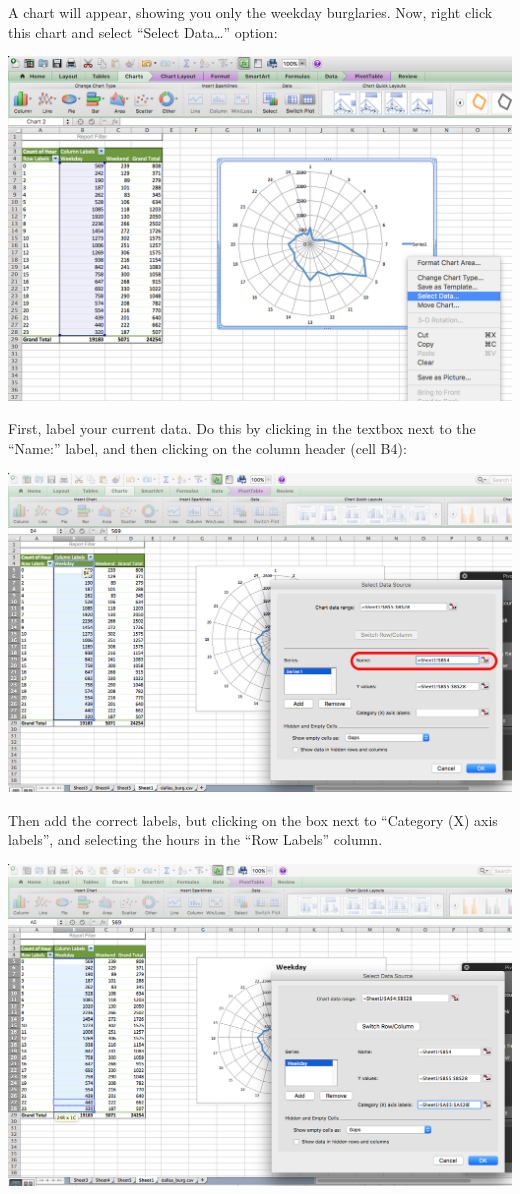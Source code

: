 \documentclass[]{book}
\theoremstyle{definition}
\theoremstyle{definition}
\theoremstyle{definition}
\theoremstyle{remark}
\begin{document}
A chart will appear, showing you only the weekday burglaries. Now, right
click this chart and select ``Select Data\ldots{}'' option:

\includegraphics{imgs/hr_r_21.png}

First, label your current data. Do this by clicking in the textbox next
to the ``Name:'' label, and then clicking on the column header (cell
B4):

\includegraphics{imgs/hr_r_22.png}

Then add the correct labels, but clicking on the box next to ``Category
(X) axis labels'', and selecting the hours in the ``Row Labels'' column.

\includegraphics{imgs/hr_r_23.png}
\end{document}

